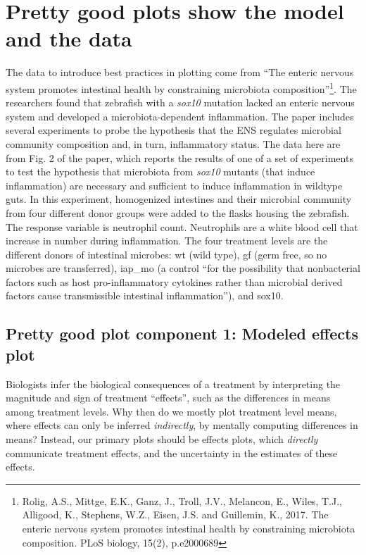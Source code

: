 \documentclass[]{book}
\let\rmarkdownfootnote\footnote%
\def\footnote{\protect\rmarkdownfootnote}
\begin{document}
\section{Pretty good plots show the model and the
data}\label{pretty-good-plots-show-the-model-and-the-data}

The data to introduce best practices in plotting come from ``The enteric
nervous system promotes intestinal health by constraining microbiota
composition''\footnote{Rolig, A.S., Mittge, E.K., Ganz, J., Troll, J.V.,
  Melancon, E., Wiles, T.J., Alligood, K., Stephens, W.Z., Eisen, J.S.
  and Guillemin, K., 2017. The enteric nervous system promotes
  intestinal health by constraining microbiota composition. PLoS
  biology, 15(2), p.e2000689}. The researchers found that zebrafish with
a \emph{sox10} mutation lacked an enteric nervous system and developed a
microbiota-dependent inflammation. The paper includes several
experiments to probe the hypothesis that the ENS regulates microbial
community composition and, in turn, inflammatory status. The data here
are from Fig. 2 of the paper, which reports the results of one of a set
of experiments to test the hypothesis that microbiota from \emph{sox10}
mutants (that induce inflammation) are necessary and sufficient to
induce inflammation in wildtype guts. In this experiment, homogenized
intestines and their microbial community from four different donor
groups were added to the flasks housing the zebrafish. The response
variable is neutrophil count. Neutrophils are a white blood cell that
increase in number during inflammation. The four treatment levels are
the different donors of intestinal microbes: wt (wild type), gf (germ
free, so no microbes are transferred), iap\_mo (a control ``for the
possibility that nonbacterial factors such as host pro-inflammatory
cytokines rather than microbial derived factors cause transmissible
intestinal inflammation''), and sox10.

\subsection{Pretty good plot component 1: Modeled effects
plot}\label{pretty-good-plot-component-1-modeled-effects-plot}

Biologists infer the biological consequences of a treatment by
interpreting the magnitude and sign of treatment ``effects'', such as
the differences in means among treatment levels. Why then do we mostly
plot treatment level means, where effects can only be inferred
\emph{indirectly}, by mentally computing differences in means? Instead,
our primary plots should be effects plots, which \emph{directly}
communicate treatment effects, and the uncertainty in the estimates of
these effects.
\end{document}
